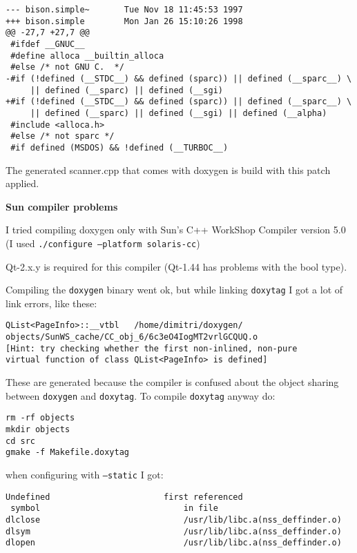 \footnotesize\begin{verbatim}
--- bison.simple~       Tue Nov 18 11:45:53 1997
+++ bison.simple        Mon Jan 26 15:10:26 1998
@@ -27,7 +27,7 @@
 #ifdef __GNUC__
 #define alloca __builtin_alloca
 #else /* not GNU C.  */
-#if (!defined (__STDC__) && defined (sparc)) || defined (__sparc__) \
     || defined (__sparc) || defined (__sgi)
+#if (!defined (__STDC__) && defined (sparc)) || defined (__sparc__) \
     || defined (__sparc) || defined (__sgi) || defined (__alpha)
 #include <alloca.h>
 #else /* not sparc */
 #if defined (MSDOS) && !defined (__TURBOC__)
\end{verbatim}
\normalsize


The generated scanner.cpp that comes with doxygen is build with this patch applied.

{\bf Sun compiler problems}

I tried compiling doxygen only with Sun's C++ Work\-Shop Compiler version 5.0 (I used {\tt ./configure --platform solaris-cc})

Qt-2.x.y is required for this compiler (Qt-1.44 has problems with the bool type).

Compiling the {\tt doxygen} binary went ok, but while linking {\tt doxytag} I got a lot of link errors, like these:



\footnotesize\begin{verbatim}
QList<PageInfo>::__vtbl   /home/dimitri/doxygen/
objects/SunWS_cache/CC_obj_6/6c3eO4IogMT2vrlGCQUQ.o
[Hint: try checking whether the first non-inlined, non-pure 
virtual function of class QList<PageInfo> is defined]
\end{verbatim}
\normalsize


These are generated because the compiler is confused about the object sharing between {\tt doxygen} and {\tt doxytag}. To compile {\tt doxytag} anyway do:



\footnotesize\begin{verbatim}
rm -rf objects
mkdir objects
cd src
gmake -f Makefile.doxytag
\end{verbatim}
\normalsize


when configuring with {\tt --static} I got:



\footnotesize\begin{verbatim}
Undefined                       first referenced
 symbol                             in file
dlclose                             /usr/lib/libc.a(nss_deffinder.o)
dlsym                               /usr/lib/libc.a(nss_deffinder.o)
dlopen                              /usr/lib/libc.a(nss_deffinder.o)
\end{verbatim}
\normalsize


